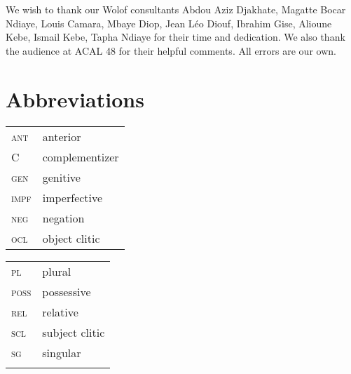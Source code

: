 \documentclass[output=paper,newtxmath,modfonts,nonflat,draftmode]{langsci/langscibook}
\begin{document}
We wish to thank our Wolof consultants Abdou Aziz Djakhate, Magatte Bocar Ndiaye, Louis Camara, Mbaye
Diop, Jean L\'eo Diouf, Ibrahim Gise,  Alioune Kebe, Ismail Kebe,
Tapha Ndiaye for their time and dedication. We also thank the audience
at ACAL 48 for their helpful comments. All errors are our own.  


\section*{Abbreviations}

\begin{tabularx}{.45\textwidth}{lQ}
\textsc{ant}  &  anterior\\
 C &  complementizer\\
 \textsc{gen}  &  genitive\\
 \textsc{impf}  &  imperfective\\
 \textsc{neg}  & negation\\
 \textsc{ocl}  &  object clitic\\
\end{tabularx}
\begin{tabularx}{.45\textwidth}{lQ}
 \textsc{pl}  &  plural\\
 \textsc{poss}  &  possessive\\
\textsc{rel}  &  relative\\
 \textsc{scl}  &  subject clitic\\
 \textsc{sg}  &  singular\\
 \\
\end{tabularx}



\sloppy
\printbibliography[heading=subbibliography,notkeyword=this]
\end{document}

